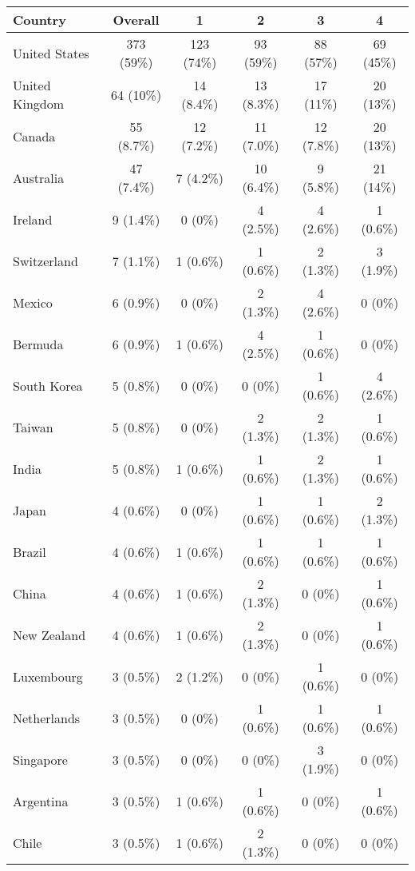 \documentclass[12pt]{article}
\begin{document}
\begin{table}
    \centering
    \footnotesize{
   \begin{tabular}{lccccc}
    \toprule
    Country & Overall & 1 & 2 & 3 & 4\\
    \midrule
    United States & 373 (59\%) & 123 (74\%) & 93 (59\%) & 88 (57\%) & 69 (45\%)\\
    United Kingdom & 64 (10\%) & 14 (8.4\%) & 13 (8.3\%) & 17 (11\%) & 20 (13\%)\\
    Canada & 55 (8.7\%) & 12 (7.2\%) & 11 (7.0\%) & 12 (7.8\%) & 20 (13\%)\\
    Australia & 47 (7.4\%) & 7 (4.2\%) & 10 (6.4\%) & 9 (5.8\%) & 21 (14\%)\\
    Ireland & 9 (1.4\%) & 0 (0\%) & 4 (2.5\%) & 4 (2.6\%) & 1 (0.6\%)\\
    Switzerland & 7 (1.1\%) & 1 (0.6\%) & 1 (0.6\%) & 2 (1.3\%) & 3 (1.9\%)\\
    Mexico & 6 (0.9\%) & 0 (0\%) & 2 (1.3\%) & 4 (2.6\%) & 0 (0\%)\\
    Bermuda & 6 (0.9\%) & 1 (0.6\%) & 4 (2.5\%) & 1 (0.6\%) & 0 (0\%)\\
    South Korea & 5 (0.8\%) & 0 (0\%) & 0 (0\%) & 1 (0.6\%) & 4 (2.6\%)\\
    Taiwan & 5 (0.8\%) & 0 (0\%) & 2 (1.3\%) & 2 (1.3\%) & 1 (0.6\%)\\
    India & 5 (0.8\%) & 1 (0.6\%) & 1 (0.6\%) & 2 (1.3\%) & 1 (0.6\%)\\
    Japan & 4 (0.6\%) & 0 (0\%) & 1 (0.6\%) & 1 (0.6\%) & 2 (1.3\%)\\
    Brazil & 4 (0.6\%) & 1 (0.6\%) & 1 (0.6\%) & 1 (0.6\%) & 1 (0.6\%)\\
    China & 4 (0.6\%) & 1 (0.6\%) & 2 (1.3\%) & 0 (0\%) & 1 (0.6\%)\\
    New Zealand & 4 (0.6\%) & 1 (0.6\%) & 2 (1.3\%) & 0 (0\%) & 1 (0.6\%)\\
    Luxembourg & 3 (0.5\%) & 2 (1.2\%) & 0 (0\%) & 1 (0.6\%) & 0 (0\%)\\
    Netherlands & 3 (0.5\%) & 0 (0\%) & 1 (0.6\%) & 1 (0.6\%) & 1 (0.6\%)\\
    Singapore & 3 (0.5\%) & 0 (0\%) & 0 (0\%) & 3 (1.9\%) & 0 (0\%)\\
    Argentina & 3 (0.5\%) & 1 (0.6\%) & 1 (0.6\%) & 0 (0\%) & 1 (0.6\%)\\
    Chile & 3 (0.5\%) & 1 (0.6\%) & 2 (1.3\%) & 0 (0\%) & 0 (0\%)\\

\end{tabular}}
\end{table}
\end{document}
